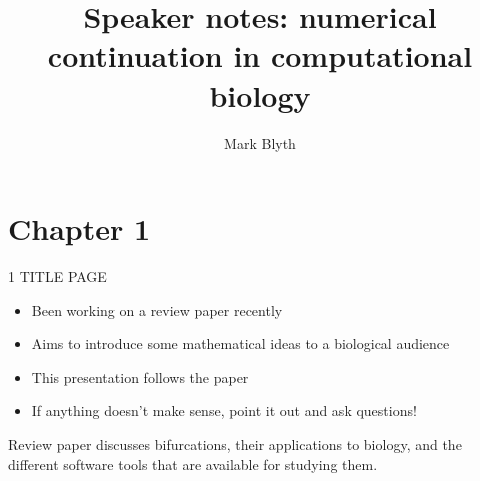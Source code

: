 \documentclass[presentation]{beamer}
\author{Mark Blyth}
\date{}
\title{Speaker notes: numerical continuation in computational biology}
\begin{document}
\maketitle

\section{Chapter 1}
\label{sec:org714520e}

\begin{frame}[label={sec:orgfe9f2a2}]{1 TITLE PAGE}
\begin{itemize}
\item Been working on a review paper recently
\item Aims to introduce some mathematical ideas to a biological audience
\item This presentation follows the paper
\item If anything doesn't make sense, point it out and ask questions!
\end{itemize}

Review paper discusses bifurcations, their applications to biology, and the different software tools that are available for studying them.
\end{frame}
\end{document}
